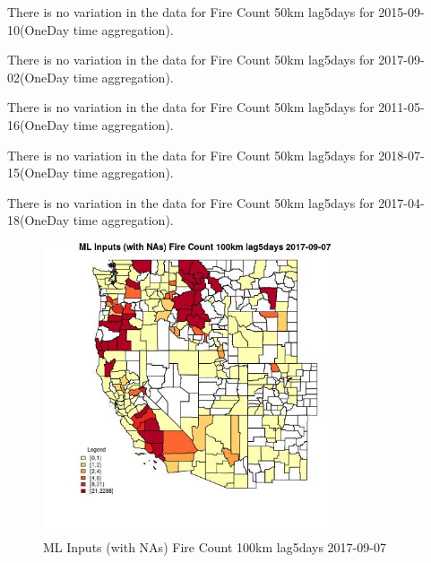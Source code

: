 There is no variation in the data for Fire Count 50km lag5days for 2015-09-10(OneDay time aggregation). 
 

There is no variation in the data for Fire Count 50km lag5days for 2017-09-02(OneDay time aggregation). 
 

There is no variation in the data for Fire Count 50km lag5days for 2011-05-16(OneDay time aggregation). 
 

There is no variation in the data for Fire Count 50km lag5days for 2018-07-15(OneDay time aggregation). 
 

There is no variation in the data for Fire Count 50km lag5days for 2017-04-18(OneDay time aggregation). 
 

\begin{figure} 
\centering  
\includegraphics[width=0.77\textwidth]{Code_Outputs/Report_ML_input_PM25_Step4_part_e_de_duplicated_aves_compiled_2019-05-21wNAs_CountyFire_Count_100km_lag5daysMean2017-09-07.jpg} 
\caption{\label{fig:Report_ML_input_PM25_Step4_part_e_de_duplicated_aves_compiled_2019-05-21wNAsCountyFire_Count_100km_lag5daysMean2017-09-07}ML Inputs (with NAs) Fire Count 100km lag5days 2017-09-07} 
\end{figure} 
 

